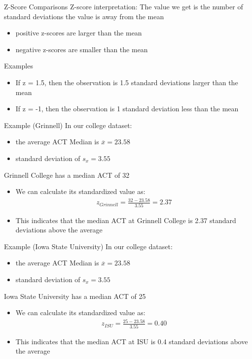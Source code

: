 \documentclass{beamer}
\begin{document}
\begin{frame}{Z-Score Comparisons}
Z-score interpretation:
The value we get is the number of standard deviations the value is away from the mean
\begin{itemize}
    \item positive z-scores are larger than the mean
    \item negative z-scores are smaller than the mean
\end{itemize} \vspace{4mm}

Examples 
\begin{itemize}
    \item If z = 1.5, then the observation is 1.5 standard deviations larger than the mean
    \item If z = -1, then the observation is 1 standard deviation less than the mean
\end{itemize}
\end{frame}

\begin{frame}{Example (Grinnell)}
In our college dataset: 
\begin{itemize}
    \item the average ACT Median is $\overline{x} = 23.58$
    \item standard deviation of $s_x = 3.55$
\end{itemize} \vspace{6mm}

Grinnell College has a median ACT of 32
\begin{itemize}
\item We can calculate its standardized value as:
\begin{align*}
z_{Grinnell} = \frac{32 - 23.58}{3.55} = 2.37
\end{align*}
\item This indicates that the median ACT at Grinnell College is 2.37 standard deviations above the average
\end{itemize}
\end{frame}



\begin{frame}{Example (Iowa State University)}
In our college dataset: 
\begin{itemize}
    \item the average ACT Median is $\overline{x} = 23.58$
    \item standard deviation of $s_x = 3.55$
\end{itemize} \vspace{6mm}

Iowa State University has a median ACT of 25
\begin{itemize}
\item We can calculate its standardized value as:
\begin{align*}
z_{ISU} = \frac{25 - 23.58}{3.55} = 0.40
\end{align*}
\item This indicates that the median ACT at ISU is 0.4 standard deviations above the average
\end{itemize}
\end{frame}
\end{document}
